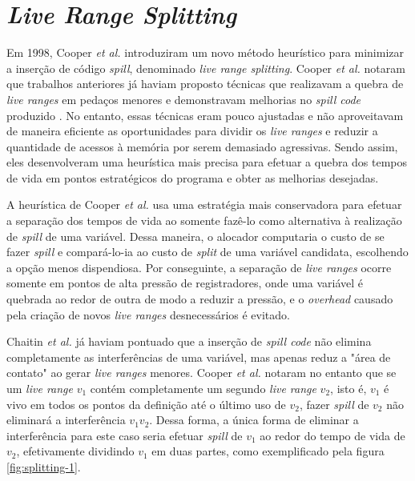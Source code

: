 \documentclass[
	12pt,				%
	openright,			%
	oneside,			%
	a4paper,			%
	tccpreliminar,			%
	]{ABNT-DC-UEL}
\begin{document}
\section{\textit{Live Range Splitting}}

Em 1998, Cooper \textit{et al.} \cite{cooper:98} introduziram um novo método heurístico para minimizar a inserção de código \textit{spill}, denominado \textit{live range splitting}. Cooper \textit{et al.} notaram que trabalhos anteriores já haviam proposto técnicas que realizavam a quebra de \textit{live ranges} em pedaços menores e demonstravam melhorias no \textit{spill code} produzido \cite{briggs:92, briggs2:92, chow:84}. No entanto, essas técnicas eram pouco ajustadas e não aproveitavam de maneira eficiente as oportunidades para dividir os \textit{live ranges} e reduzir a quantidade de acessos à memória por serem demasiado agressivas. Sendo assim, eles desenvolveram uma heurística mais precisa para efetuar a quebra dos tempos de vida em pontos estratégicos do programa e obter as melhorias desejadas.

A heurística de Cooper \textit{et al.} usa uma estratégia mais conservadora para efetuar a separação dos tempos de vida ao somente fazê-lo como alternativa à realização de \textit{spill} de uma variável. Dessa maneira, o alocador computaria o custo de se fazer \textit{spill} e compará-lo-ia ao custo de \textit{split} de uma variável candidata, escolhendo a opção menos dispendiosa. Por conseguinte, a separação de \textit{live ranges} ocorre somente em pontos de alta pressão de registradores, onde uma variável é quebrada ao redor de outra de modo a reduzir a pressão, e o \textit{overhead} causado pela criação de novos \textit{live ranges} desnecessários é evitado.

Chaitin \textit{et al.} \cite{chaitin:82} já haviam pontuado que a inserção de \textit{spill code} não elimina completamente as interferências de uma variável, mas apenas reduz a "área de contato" ao gerar \textit{live ranges} menores. Cooper \textit{et al.} notaram no entanto que se um \textit{live range} $v_1$ contém completamente um segundo \textit{live range} $v_2$, isto é, $v_1$ é vivo em todos os pontos da definição até o último uso de $v_2$, fazer \textit{spill} de $v_2$ não eliminará a interferência $v_1v_2$. Dessa forma, a única forma de eliminar a interferência para este caso seria efetuar \textit{spill} de $v_1$ ao redor do tempo de vida de $v_2$, efetivamente dividindo $v_1$ em duas partes, como exemplificado pela figura \ref{fig:splitting-1}.
\end{document}
